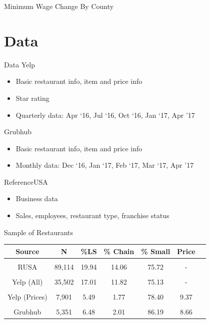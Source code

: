 \documentclass[xcolor=table]{beamer}
\begin{document}
\begin{spacing}{1.2}
\begin{frame}{Minimum Wage Change By County}
\end{frame}

\section{Data}

\begin{frame}{Data}
Yelp 
\begin{itemize}
\item Basic restaurant info, item and price info
\item Star rating 
\item Quarterly data: Apr `16, Jul `16, Oct `16, Jan `17, Apr '17
\end{itemize}

Grubhub
\begin{itemize}
\item Basic restaurant info, item and price info
\item Monthly data: Dec `16, Jan `17, Feb `17, Mar `17, Apr '17
\end{itemize}

ReferenceUSA
\begin{itemize}
\item Business data
\item Sales, employees, restaurant type, franchise status
\end{itemize}

\end{frame}




\begin{frame}{Sample of Restaurants}

\centering
\small
\begin{tabular}{ccccccc } \\ \hline \hline
Source & N & \%LS  & \% Chain   & \% Small & Price \\ \hline \hline
&&& \\
RUSA & 89,114 & 19.94 & 14.06 & 75.72 & -\\
\\
Yelp (All) & 35,502 & 17.01 & 11.82 & 75.13& - \\
\\
Yelp (Prices) & 7,901 & 5.49  & 1.77 & 78.40 & 9.37 \\
\\ 
Grubhub  & 5,351 & 6.48 & 2.01 &  86.19 & 8.66 \\
\end{tabular}
\end{frame}


\end{spacing}
\end{document}

